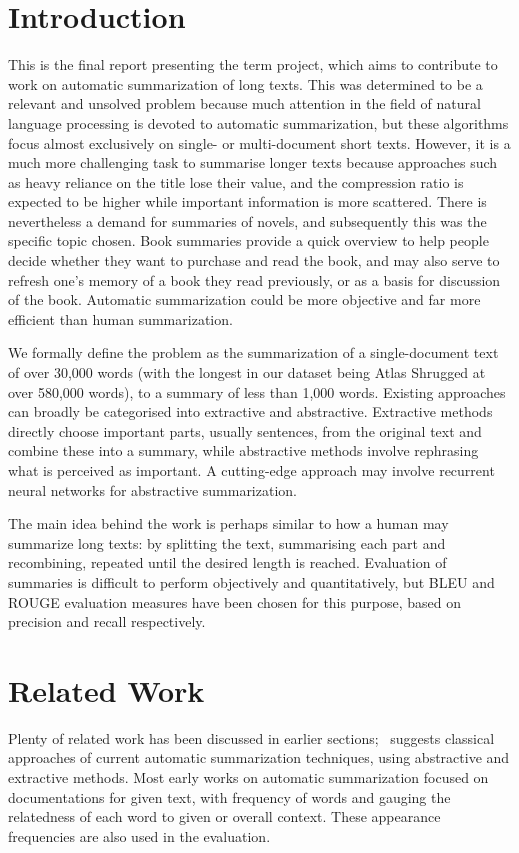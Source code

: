 \section{Introduction}
This is the final report presenting the term project, which aims to contribute to work on automatic summarization of long texts. This was determined to be a relevant and unsolved problem because much attention in the field of natural language processing is devoted to automatic summarization, but these algorithms focus almost exclusively on single- or multi-document short texts. However, it is a much more challenging task to summarise longer texts because approaches such as heavy reliance on the title lose their value, and the compression ratio is expected to be higher while important information is more scattered. There is nevertheless a demand for summaries of novels, and subsequently this was the specific topic chosen. Book summaries provide a quick overview to help people decide whether they want to purchase and read the book, and may also serve to refresh one's memory of a book they read previously, or as a basis for discussion of the book. Automatic summarization could be more objective and far more efficient than human summarization.

We formally define the problem as the summarization of a single-document text of over 30,000 words (with the longest in our dataset being Atlas Shrugged at over 580,000 words), to a summary of less than 1,000 words. Existing approaches can broadly be categorised into extractive and abstractive. Extractive methods directly choose important parts, usually sentences, from the original text and combine these into a summary, while abstractive methods involve rephrasing what is perceived as important. A cutting-edge approach may involve recurrent neural networks for abstractive summarization.


The main idea behind the work is perhaps similar to how a human may summarize long texts: by splitting the text, summarising each part and recombining, repeated until the desired length is reached. Evaluation of summaries is difficult to perform objectively and quantitatively, but BLEU and ROUGE evaluation measures have been chosen for this purpose, based on precision and recall respectively.

\section{Related Work}
Plenty of related work has been discussed in earlier sections;~\cite{Gaikwad2016} 
suggests classical approaches of current automatic summarization techniques, 
using abstractive and extractive methods. Most early works on 
automatic summarization focused on documentations for given text, with 
frequency of words and gauging the relatedness of each word to given or overall
context. These appearance frequencies are also used in the evaluation.

